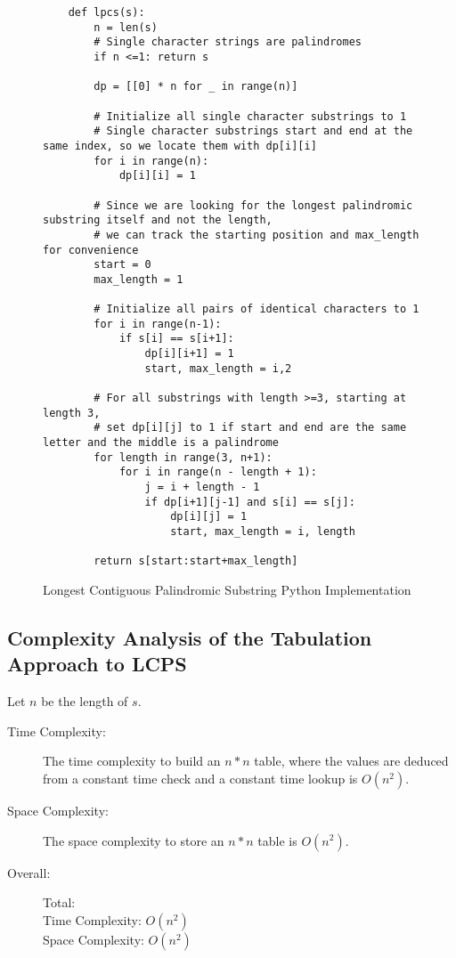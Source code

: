 \begin{figure}[H]
    \centering
    \begin{lstlisting}
    def lpcs(s):
        n = len(s)
        # Single character strings are palindromes
        if n <=1: return s

        dp = [[0] * n for _ in range(n)]
    
        # Initialize all single character substrings to 1
        # Single character substrings start and end at the same index, so we locate them with dp[i][i]
        for i in range(n):
            dp[i][i] = 1
    
        # Since we are looking for the longest palindromic substring itself and not the length,
        # we can track the starting position and max_length for convenience
        start = 0
        max_length = 1
    
        # Initialize all pairs of identical characters to 1
        for i in range(n-1):
            if s[i] == s[i+1]:
                dp[i][i+1] = 1
                start, max_length = i,2
    
        # For all substrings with length >=3, starting at length 3, 
        # set dp[i][j] to 1 if start and end are the same letter and the middle is a palindrome
        for length in range(3, n+1):
            for i in range(n - length + 1):
                j = i + length - 1
                if dp[i+1][j-1] and s[i] == s[j]:
                    dp[i][j] = 1
                    start, max_length = i, length
    
        return s[start:start+max_length]
    \end{lstlisting}
    \caption{Longest Contiguous Palindromic Substring Python Implementation}
    \label{fig:lpcs-dp}
\end{figure}

\subsection{Complexity Analysis of the Tabulation Approach to LCPS}
Let $n$ be the length of $s$.

\begin{description}
    \item[Time Complexity:]
        The time complexity to build an $n * n$ table,
        where the values are deduced from a constant time check and a constant time lookup is $O(n^2)$. 

    \item[Space Complexity:] 
        The space complexity to store an $n * n$ table is $O(n^2)$.

        
    \item[Overall:] Total:\\
        Time Complexity: $O(n^2)$\\
        Space Complexity: $O(n^2)$
    
\end{description}